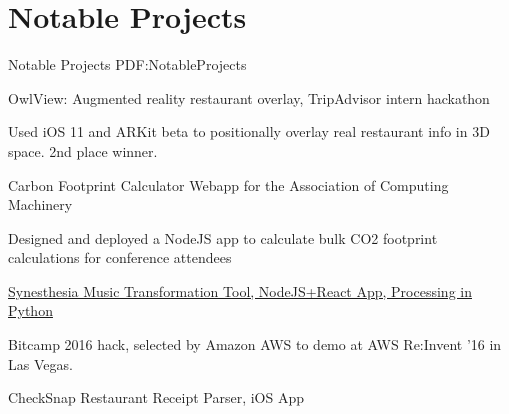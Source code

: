 
\section
{Notable Projects}
{Notable Projects}
{PDF:NotableProjects}

\iffalse
\BulletItem
\href{http://parapit.com}
{Parapit Community Platform}
\hfill
\DatestampY{2016}
\begin{detail}
\SubBulletItem
Threat sharing platform and information feed for infosec professionals. Designed using NodeJS and ReactJS.
\SubBulletItem
Unstructured text classification and processing developed with the Python NLTK framework. 
\end{detail}
\fi 

\BulletItem
OwlView: Augmented reality restaurant overlay, TripAdvisor intern hackathon
\hfill
{}
\begin{detail}
\SubBulletItem
Used iOS 11 and ARKit beta to positionally overlay real restaurant info in 3D space. 2nd place winner.
\end{detail}

\BulletItem
Carbon Footprint Calculator Webapp for the Association of Computing Machinery 
\hfill
{}
\begin{detail}
\SubBulletItem
Designed and deployed a NodeJS app to calculate bulk CO2 footprint calculations for conference attendees
\end{detail}

\GapNoBreak
\BulletItem
\href{https://github.com/bekher/synesthesia-web}
{Synesthesia Music Transformation Tool, NodeJS+React App, Processing in Python}
\hfill
{}
\begin{detail}
\SubBulletItem
Bitcamp 2016 hack, selected by Amazon AWS to demo at AWS Re:Invent '16 in Las Vegas.
\end{detail}

\GapNoBreak
\BulletItem
CheckSnap Restaurant Receipt Parser, iOS App
\hfill
{}

